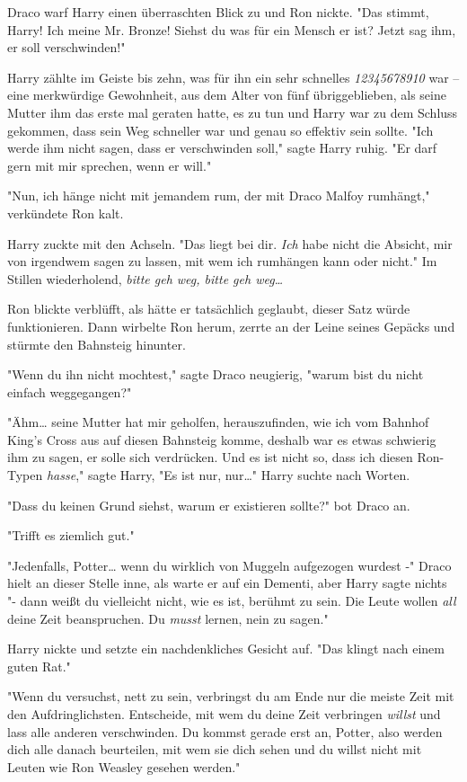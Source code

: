 {Draco warf Harry einen überraschten Blick zu und Ron nickte. "Das stimmt, Harry! Ich meine Mr. Bronze! Siehst du was für ein Mensch er ist? Jetzt sag ihm, er soll verschwinden!"

Harry zählte im Geiste bis zehn, was für ihn ein sehr schnelles \emph{12345678910} war -- eine merkwürdige Gewohnheit, aus dem Alter von fünf übriggeblieben, als seine Mutter ihm das erste mal geraten hatte, es zu tun und Harry war zu dem Schluss gekommen, dass sein Weg schneller war und genau so effektiv sein sollte. "Ich werde ihm nicht sagen, dass er verschwinden soll," sagte Harry ruhig. "Er darf gern mit mir sprechen, wenn er will."

"Nun, ich hänge nicht mit jemandem rum, der mit Draco Malfoy rumhängt," verkündete Ron kalt.

Harry zuckte mit den Achseln. "Das liegt bei dir. \emph{Ich} habe nicht die Absicht, mir von irgendwem sagen zu lassen, mit wem ich rumhängen kann oder nicht." Im Stillen wiederholend, \emph{bitte geh weg, bitte geh weg…}

Ron blickte verblüfft, als hätte er tatsächlich geglaubt, dieser Satz würde funktionieren. Dann wirbelte Ron herum, zerrte an der Leine seines Gepäcks und stürmte den Bahnsteig hinunter.

"Wenn du ihn nicht mochtest," sagte Draco neugierig, "warum bist du nicht einfach weggegangen?"

"Ähm… seine Mutter hat mir geholfen, herauszufinden, wie ich vom Bahnhof King's Cross aus auf diesen Bahnsteig komme, deshalb war es etwas schwierig ihm zu sagen, er solle sich verdrücken. Und es ist nicht so, dass ich diesen Ron-Typen \emph{hasse}," sagte Harry, "Es ist nur, nur…" Harry suchte nach Worten.

"Dass du keinen Grund siehst, warum er existieren sollte?" bot Draco an.

"Trifft es ziemlich gut."

"Jedenfalls, Potter… wenn du wirklich von Muggeln aufgezogen wurdest -" Draco hielt an dieser Stelle inne, als warte er auf ein Dementi, aber Harry sagte nichts "- dann weißt du vielleicht nicht, wie es ist, berühmt zu sein. Die Leute wollen \emph{all} deine Zeit beanspruchen. Du \emph{musst} lernen, nein zu sagen."

Harry nickte und setzte ein nachdenkliches Gesicht auf. "Das klingt nach einem guten Rat."

"Wenn du versuchst, nett zu sein, verbringst du am Ende nur die meiste Zeit mit den Aufdringlichsten. Entscheide, mit wem du deine Zeit verbringen \emph{willst} und lass alle anderen verschwinden. Du kommst gerade erst an, Potter, also werden dich alle danach beurteilen, mit wem sie dich sehen und du willst nicht mit Leuten wie Ron Weasley gesehen werden."

}
